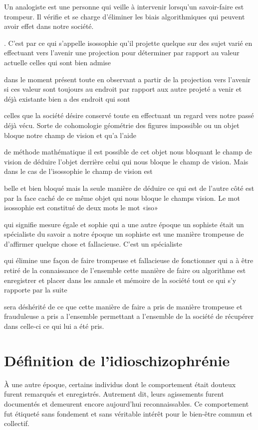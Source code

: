 \documentclass[12pt,oneside]{article}
\begin{document}
Un analogiste est une personne qui veille à intervenir lorsqu'un savoir-faire est trompeur. Il vérifie et se charge d'éliminer les biais algorithmiques qui peuvent avoir effet dans notre société.

. C'est par ce qui s'appelle isossophie qu'il projette quelque sur des sujet varié en effectuant vers l'avenir une projection pour déterminer par rapport au valeur actuelle celles qui sont bien admise 

dans le moment présent toute en observant a partir de la projection vers l'avenir si ces valeur sont toujours au endroit par rapport aux autre projeté a venir et déjà existante bien a des endroit qui sont

celles que la société désire conservé toute en effectuant un regard vers notre passé déjà vécu. Sorte de cohomologie géométrie des figures impossible ou un objet bloque notre champ de vision et qu'a l'aide

de méthode mathématique il est possible de cet objet nous bloquant le champ de vision de déduire l'objet derrière celui qui nous bloque le champ de vision. Mais dans le cas de l'isossophie le champ de vision est 

belle et bien bloqué mais la seule manière de déduire ce qui est de l'autre côté est par la face caché de ce même objet qui nous bloque le champs vision. Le mot isossophie est constitué de deux mots le mot «iso»

qui signifie mesure égale et sophie qui a une autre époque un sophiste était un spécialiste du savoir a notre époque un sophiste est une manière trompeuse de d'affirmer quelque chose et fallacieuse. C'est un spécialiste

qui élimine une façon de faire trompeuse et fallacieuse de fonctionner qui a à être retiré de la connaissance de l'ensemble cette manière de faire ou algorithme est enregistrer et placer dans les annale et mémoire de la société tout ce qui s'y rapporte par la suite

sera déshérité de ce que cette manière de faire a pris de manière trompeuse et frauduleuse a pris a l'ensemble permettant a l'ensemble de la société de récupérer dans celle-ci ce qui lui a été pris.


\section{Définition de l'idioschizophrénie}

À une autre époque, certains individus dont le comportement était douteux furent remarqués et enregistrés. Autrement dit, leurs agissements furent documentés et demeurent encore aujourd'hui reconnaissables. Ce comportement fut étiqueté sans fondement et sans véritable intérêt pour le bien-être commun et collectif.
\end{document}
